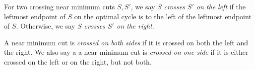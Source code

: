 %
%
%
%
%

\begin{definition}
	For two crossing near minimum cuts $S,S'$, we say $S$ {\em crosses $S'$ on the left} if the leftmost endpoint of $S$ on the optimal cycle is to the left of the leftmost endpoint of $S$. Otherwise, we say {\em $S$ crosses $S'$ on the right}. 
	
	
	A near minimum cut is {\em crossed on both sides} if it is crossed on both the left and the right.
	We also say a a near minimum cut is {\em crossed on one side} if it is either crossed on the left or on the right, but not both.
\end{definition}

